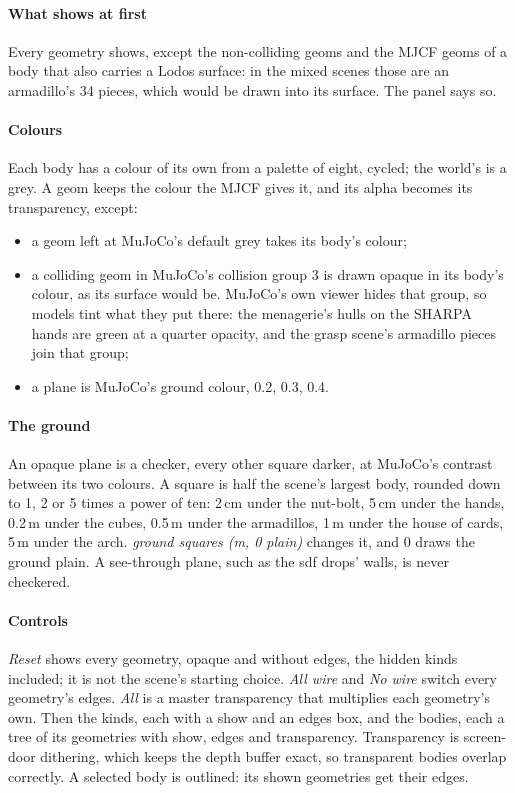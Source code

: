\paragraph{What shows at first} Every geometry shows, except the non-colliding geoms and the MJCF geoms of a body that also carries a Lodos surface: in the mixed scenes those are an armadillo's 34 pieces, which would be drawn into its surface. The panel says so.

\paragraph{Colours} Each body has a colour of its own from a palette of eight, cycled; the world's is a grey. A geom keeps the colour the MJCF gives it, and its alpha becomes its transparency, except:

\begin{itemize}
\item a geom left at MuJoCo's default grey takes its body's colour;
\item a colliding geom in MuJoCo's collision group 3 is drawn opaque in its body's colour, as its surface would be. MuJoCo's own viewer hides that group, so models tint what they put there: the menagerie's hulls on the SHARPA hands are green at a quarter opacity, and the grasp scene's armadillo pieces join that group;
\item a plane is MuJoCo's ground colour, 0.2, 0.3, 0.4.
\end{itemize}

\paragraph{The ground} An opaque plane is a checker, every other square darker, at MuJoCo's contrast between its two colours. A square is half the scene's largest body, rounded down to 1, 2 or 5 times a power of ten: 2\,cm under the nut-bolt, 5\,cm under the hands, 0.2\,m under the cubes, 0.5\,m under the armadillos, 1\,m under the house of cards, 5\,m under the arch. \emph{ground squares (m, 0 plain)} changes it, and 0 draws the ground plain. A see-through plane, such as the sdf drops' walls, is never checkered.

\paragraph{Controls} \emph{Reset} shows every geometry, opaque and without edges, the hidden kinds included; it is not the scene's starting choice. \emph{All wire} and \emph{No wire} switch every geometry's edges. \emph{All} is a master transparency that multiplies each geometry's own. Then the kinds, each with a show and an edges box, and the bodies, each a tree of its geometries with show, edges and transparency. Transparency is screen-door dithering, which keeps the depth buffer exact, so transparent bodies overlap correctly. A selected body is outlined: its shown geometries get their edges.

